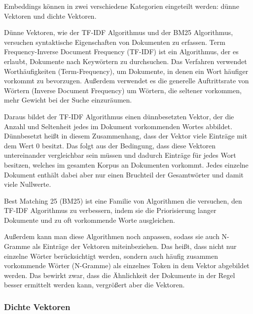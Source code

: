 Embeddings können in zwei verschiedene Kategorien eingeteilt werden: dünne Vektoren und dichte Vektoren.

Dünne Vektoren, wie der TF-IDF Algorithmus und der BM25 Algorithmus, versuchen syntaktische Eigenschaften von Dokumenten zu erfassen.
Term Frequency-Inverse Document Frequency (TF-IDF) ist ein Algorithmus, der es erlaubt, Dokumente nach Keywörtern zu durchsuchen.
Das Verfahren verwendet Worthäufigkeiten (Term-Frequency), um Dokumente, in denen ein Wort häufiger vorkommt zu bevorzugen.
Außerdem verwendet es die generelle Auftrittsrate von Wörtern (Inverse Document Frequency) um Wörtern, die seltener vorkommen, mehr Gewicht bei der Suche einzuräumen.

Daraus bildet der TF-IDF Algorithmus einen dünnbesetzten Vektor, der die Anzahl und Seltenheit jedes im Dokument vorkommenden Wortes abbildet. 
Dünnbesetzt heißt in diesem Zusammenhang, dass der Vektor viele Einträge mit dem Wert 0 besitzt. 
Das folgt aus der Bedingung, dass diese Vektoren untereinander vergleichbar sein müssen und dadurch Einträge für jedes Wort besitzen, welches im gesamten Korpus an Dokumenten vorkommt.
Jedes einzelne Dokument enthält dabei aber nur einen Bruchteil der Gesamtwörter und damit viele Nullwerte.

Best Matching 25 (BM25) ist eine Familie von Algorithmen die versuchen, den TF-IDF Algorithmus zu verbessern, indem sie die Priorisierung langer Dokumente und zu oft vorkommende Worte ausgleichen.

Außerdem kann man diese Algorithmen noch anpassen, sodass sie auch N-Gramme als Einträge der Vektoren miteinbeziehen. 
Das heißt, dass nicht nur einzelne Wörter berücksichtigt werden, sondern auch häufig zusammen vorkommende Wörter (N-Gramme) als einzelnes Token in dem Vektor abgebildet werden. 
Das bewirkt zwar, dass die Ähnlichkeit der Dokumente in der Regel besser ermittelt werden kann, vergrößert aber die Vektoren.

\subsubsection{Dichte Vektoren}

